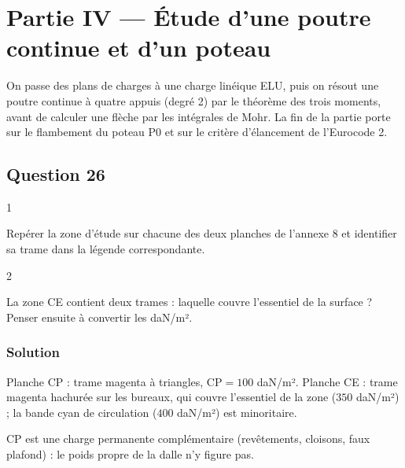 \documentclass[11pt,a4paper]{article}
\newcommand{\equationajustee}[1]{%
  \sbox{\boiteequation}{$\displaystyle #1$}%
  \ifdim\wd\boiteequation>\linewidth
    \[\resizebox{\linewidth}{!}{\usebox{\boiteequation}}\]%
  \else
    \[#1\]%
  \fi}
\begin{document}
\hypertarget{partie-iv-uxe9tude-dune-poutre-continue-et-dun-poteau}{%
\section{Partie IV --- Étude d'une poutre continue et d'un poteau}\label{partie-iv-uxe9tude-dune-poutre-continue-et-dun-poteau}}

On passe des plans de charges à une charge linéique ELU, puis on résout une poutre continue à quatre appuis (degré 2) par le théorème des trois moments, avant de calculer une flèche par les intégrales de Mohr. La fin de la partie porte sur le flambement du poteau P0 et sur le critère d'élancement de l'Eurocode 2.

\hypertarget{question-26}{%
\subsection{Question 26}\label{question-26}}

\begin{indication}{1}

Repérer la zone d'étude sur chacune des deux planches de l'annexe 8 et identifier sa trame dans la légende correspondante.

\end{indication}

\begin{indication}{2}

La zone CE contient deux trames : laquelle couvre l'essentiel de la surface ? Penser ensuite à convertir les daN/m².

\end{indication}

\hypertarget{solution-25}{%
\subsubsection{Solution}\label{solution-25}}

Planche CP : trame magenta à triangles, \(\text{CP}=100\) daN/m². Planche CE : trame magenta hachurée sur les bureaux, qui couvre l'essentiel de la zone (\(350\) daN/m²) ; la bande cyan de circulation (\(400\) daN/m²) est minoritaire.

\equationajustee{\boxed{\begin{aligned}
\text{CP}&=1{,}0\ \text{kN/m}^2\\
\text{CE}&=3{,}5\ \text{kN/m}^2
\end{aligned}}}

CP est une charge permanente complémentaire (revêtements, cloisons, faux plafond) : le poids propre de la dalle n'y figure pas.
\end{document}
